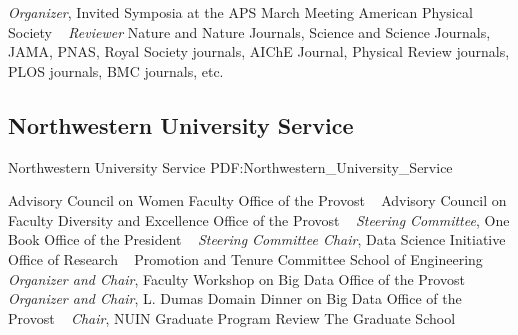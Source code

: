 \textit{Organizer}, Invited Symposia at the APS March Meeting \newline
American Physical Society \newline
~
\Gap
{}
\textit{Reviewer}
Nature and Nature Journals, Science and Science Journals, JAMA, PNAS, Royal Society journals, AIChE Journal, Physical Review journals, PLOS journals, BMC journals, etc. \newline
~
\Gap
\vspace*{0.2cm}\subsection
{Northwestern University Service}
{Northwestern University Service}
{PDF:Northwestern_University_Service}

\GapNoBreak
{}
Advisory Council on Women Faculty\newline
Office of the Provost \newline
~
\Gap
{}
Advisory Council on Faculty Diversity and Excellence\newline
Office of the Provost \newline
~
\Gap
{}
\textit{Steering Committee}, One Book\newline
Office of the President \newline
~
\Gap
{}
\textit{Steering Committee Chair}, Data Science Initiative \newline
Office of Research \newline
~
\Gap
{}
Promotion and Tenure Committee\newline
School of Engineering \newline
~
\Gap
{}
\textit{Organizer and Chair}, Faculty Workshop on Big Data\newline
Office of the Provost \newline
~
\Gap
{}
\textit{Organizer and Chair}, L. Dumas Domain Dinner on Big Data\newline
Office of the Provost \newline
~
\Gap
{}
\textit{Chair}, NUIN Graduate Program Review \newline
The Graduate School \newline
